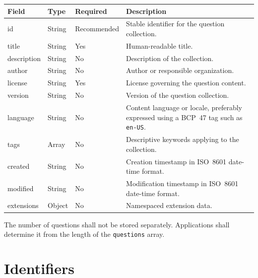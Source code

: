 \documentclass[11pt]{article}
\begin{document}
	\begin{longtable}{|>{\ttfamily}p{2.8cm}|p{1.8cm}|p{1.7cm}|p{7.8cm}|}
		\hline
		\textbf{Field} & \textbf{Type} & \textbf{Required} &
		\textbf{Description} \\ \hline
		\endfirsthead
		
		id & String & Recommended &
		Stable identifier for the question collection. \\ \hline
		
		title & String & Yes &
		Human-readable title. \\ \hline
		
		description & String & No &
		Description of the collection. \\ \hline
		
		author & String & No &
		Author or responsible organization. \\ \hline
		
		license & String & Yes &
		License governing the question content. \\ \hline
		
		version & String & No &
		Version of the question collection. \\ \hline
		
		language & String & No &
		Content language or locale, preferably expressed using a BCP~47 tag such
		as \texttt{en-US}. \\ \hline
		
		tags & Array & No &
		Descriptive keywords applying to the collection. \\ \hline
		
		created & String & No &
		Creation timestamp in ISO~8601 date-time format. \\ \hline
		
		modified & String & No &
		Modification timestamp in ISO~8601 date-time format. \\ \hline
		
		extensions & Object & No &
		Namespaced extension data. \\ \hline
		
	\end{longtable}
	
	The number of questions shall not be stored separately. Applications shall
	determine it from the length of the \texttt{questions} array.
	
	\section{Identifiers}
	
\end{document}
